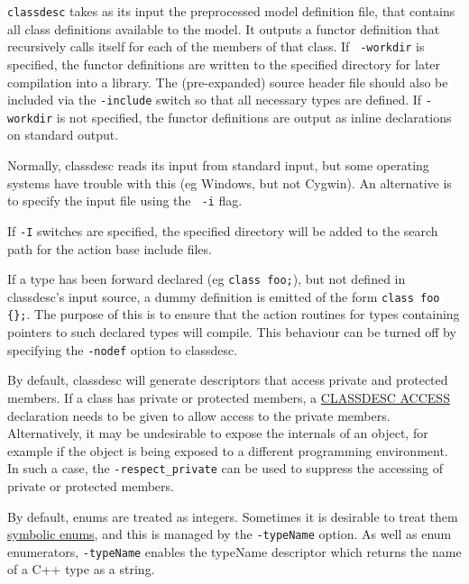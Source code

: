 {\tt classdesc} takes as its input the preprocessed model definition
file, that contains all class definitions available to the model. It
outputs a functor definition that recursively calls
itself for each of the members of that class. If {\tt
  -workdir} is specified, the functor definitions are
written to the specified directory for later compilation into a
library. The (pre-expanded) source header file should also be included
via the {\tt -include} switch so that all necessary
types are defined. If {\tt -workdir} is not specified, the functor
definitions are output as inline declarations on standard output.

Normally, classdesc reads its input from standard input, but some
operating systems have trouble with this (eg Windows, but not
Cygwin). An alternative is to specify the input file using the {\tt
  -i} flag.

If {\tt -I} switches are specified, the specified directory will be
added to the search path for the action base include files.

If a type has been forward declared (eg \verb+class foo;+), but not
defined in classdesc's input source, a dummy definition is emitted of
the form \verb+class foo {};+. The purpose of this is to ensure that
the action routines for types containing pointers to such declared
types will compile. This behaviour can be turned off by specifying the
\verb+-nodef+ option to classdesc.

By default, classdesc will generate descriptors that access private
and protected members. If a class has private or protected members, a
\hyperref{{\tt CLASSDESC\_ACCESS}}{ (see
  \S}{)}{CLASSDESC ACCESS} declaration needs
to be given to allow access to the private members. Alternatively, it
may be undesirable to expose the internals of an object, for example
if the object is being exposed to a different programming
environment. In such a case, the
\verb+-respect_private+ can be used to
suppress the accessing of private or protected members.



By default, enums are treated as integers. Sometimes it is desirable
to treat them \hyperref{symbolically}{ (see \S}{)}{symbolic enums}, and
this is managed by the \verb+-typeName+ option. As
well as enum enumerators,  \verb+-typeName+ enables the typeName
descriptor which returns the name of a C++ type as a string.


